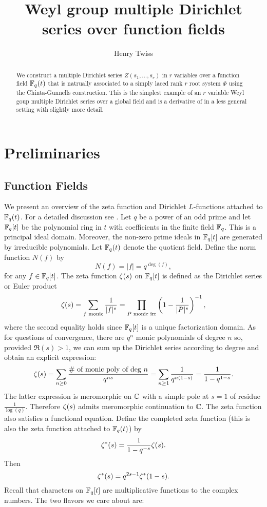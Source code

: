 \documentclass[12pt,reqno,oneside]{amsart}
\title{Weyl group multiple Dirichlet series over function fields}
\author{Henry Twiss}
\begin{document}
\begin{abstract}
    We construct a multiple Dirichlet series $Z(s_{1},\ldots,s_{r})$ in $r$ variables over a function field $\mathbb{F}_{q}(t)$ that is natrually associated to a simply laced rank $r$ root system $\Phi$ using the Chinta-Gunnells construction. This is the simplest example of an $r$ variable Weyl goup multiple Dirichlet series over a global field and is a derivative of \cite{CG} in a less general setting with slightly more detail. 
\end{abstract}

\maketitle

\section{Preliminaries}
    \subsection*{Function Fields}
        We present an overview of the zeta function and Dirichlet $L$-functions attached to $\mathbb{F}_{q}(t)$. For a detailed discussion see \cite{R}. Let $q$ be a power of an odd prime and let $\mathbb{F}_{q}[t]$ be the polynomial ring in $t$ with coefficients in the finite field $\mathbb{F}_{q}$. This is a principal ideal domain. Moreover, the non-zero prime ideals in $\mathbb{F}_{q}[t]$ are generated by irreducible polynomials. Let $\mathbb{F}_{q}(t)$ denote the quotient field. Define the norm function $N(f)$ by
        \[
            N(f) = |f| = q^{\deg(f)},
        \]
        for any $f \in \mathbb{F}_{q}[t]$. The zeta function $\zeta(s)$ on $\mathbb{F}_{q}[t]$ is defined as the Dirichlet series or Euler product
        \[
            \zeta(s) = \sum_{\text{$f$ monic}}\frac{1}{|f|^{s}} = \prod_{\text{$P$ monic irr}}\left(1-\frac{1}{|P|^{s}}\right)^{-1},
        \]
        where the second equality holds since $\mathbb{F}_{q}[t]$ is a unique factorization domain. As for questions of convergence, there are $q^{n}$ monic polynomials of degree $n$ so, provided $\Re(s) > 1$, we can sum up the Dirichlet series according to degree and obtain an explicit expression:
        \[
            \zeta(s) = \sum_{n \ge 0}\frac{\text{\# of monic poly of deg $n$}}{q^{ns}} = \sum_{n \ge 1}\frac{1}{q^{n(1-s)}} = \frac{1}{1-q^{1-s}}.
        \]
        The latter expression is meromorphic on $\mathbb{C}$ with a simple pole at $s = 1$ of residue $\frac{1}{\log(q)}$. Therefore $\zeta(s)$ admits meromorphic continuation to $\mathbb{C}$. The zeta function also satisfies a functional equation. Define the completed zeta function (this is also the zeta function attached to $\mathbb{F}_{q}(t)$) by
        \[
            \zeta^{\ast}(s) = \frac{1}{1-q^{-s}}\zeta(s).
        \]
        Then
        \[
            \zeta^{\ast}(s) = q^{2s-1}\zeta^{\ast}(1-s).
        \]
        Recall that characters on $\mathbb{F}_{q}[t]$ are multiplicative functions to the complex numbers. The two flavors we care about are:
        
\end{document}
